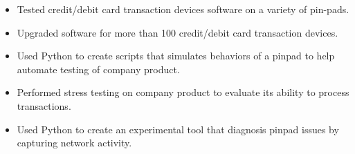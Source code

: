 \documentclass[10pt,a4paper]{altacv}
\begin{document}

\begin{fullwidth}
\makecvheader
\end{fullwidth}



\begin{itemize}
\item Tested credit/debit card transaction devices software on a variety of pin-pads.
\item Upgraded software for more than 100 credit/debit card transaction devices.
\end{itemize}

\divider

\begin{itemize}
\item Used Python to create scripts that simulates behaviors of a pinpad to help automate testing of company product.
\item Performed stress testing on company product to evaluate its ability to process transactions.
\item Used Python to create an experimental tool that diagnosis pinpad issues by capturing network activity.
\end{itemize}


\end{document}

